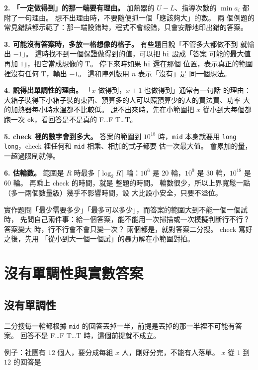 \textbf{2. 「一定做得到」的那一端要有理由。} 加熱器的 $U - L$、指導次數的
$\min a_i$ 都附了一句理由。 想不出理由時，不要隨便抓一個「應該夠大」的數。 兩
個例題的常見錯誤都示範了：那一端設錯時，程式不會報錯，只會安靜地印出錯的答案。

\textbf{3. 可能沒有答案時，多放一格想像的格子。} 有些題目說「不管多大都做不到
就輸出 $-1$」。 這時找不到一個保證做得到的值，可以把 \texttt{hi} 設成「答案
可能的最大值再加 $1$」，把它當成想像的 T。 停下來時如果 \texttt{hi} 還在那個
位置，表示真正的範圍裡沒有任何 T，輸出 $-1$。 這和陣列版用 $n$ 表示「沒有」是
同一個想法。

\textbf{4. 說得出單調性的理由。} 「$x$ 做得到，$x + 1$ 也做得到」通常有一句話
的理由：大箱子裝得下小箱子裝的東西、預算多的人可以照預算少的人的買法買、功率
大的加熱器每小時水溫都不比較低。 說不出來時，先在小範圍把 $x$ 從小到大每個都
跑一次 \texttt{ok}，看回答是不是真的 F…F T…T。

\textbf{5. check 裡的數字會到多大。} 答案的範圍到 $10^{18}$ 時，\texttt{mid}
本身就要用 \texttt{long long}，check 裡任何和 \texttt{mid} 相乘、相加的式子都要
估一次最大值。 會累加的量，一超過限制就停。

\textbf{6. 估輪數。} 範圍是 $R$ 時最多 $\lceil \log_2 R \rceil$ 輪：$10^6$ 是
$20$ 輪，$10^9$ 是 $30$ 輪，$10^{18}$ 是 $60$ 輪。 再乘上 check 的時間，就是
整題的時間。 輪數很少，所以上界寬鬆一點（多一兩個數量級）幾乎不影響時間，設
大比設小安全，只要不溢位。

\begin{apcsnote}
實作題問「最少需要多少」「最多可以多少」，而答案的範圍大到不能一個一個試時，
先問自己兩件事：給一個答案，能不能用一次掃描或一次模擬判斷行不行？ 答案變大
時，行不行會不會只變一次？ 兩個都是，就對答案二分搜。 check 寫好之後，先用
「從小到大一個一個試」的暴力解在小範圍對拍。
\end{apcsnote}

\section{沒有單調性與實數答案}
\label{sec:bs-fails}

\subsection{沒有單調性}

二分搜每一輪都根據 \texttt{mid} 的回答丟掉一半，前提是丟掉的那一半裡不可能有答
案。 回答不是 F…F T…T 時，這個前提就不成立。

例子：社團有 $12$ 個人，要分成每組 $x$ 人，剛好分完，不能有人落單。 $x$ 從
$1$ 到 $12$ 的回答是

